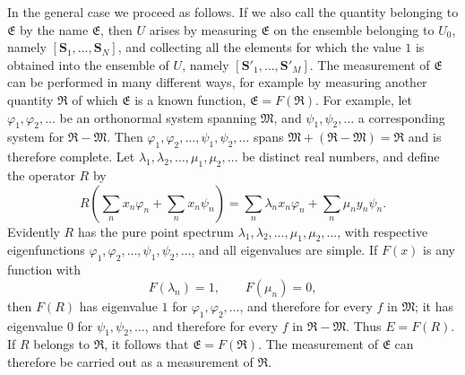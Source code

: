 \documentclass[fontsize=13pt,twoside,openany,headings=normal,parskip=false,bookmarkpackage=false,DIV=calc]{scrbook}
\begin{document}
In the general case we proceed as follows. If we also call the quantity belonging to $\mathfrak E$ by the name $\mathfrak E$, then $U$ arises by
\hypertarget{origpage-181}{}%
measuring $\mathfrak E$ on the ensemble belonging to $U_0$, namely $[\boldsymbol{S}_1,\ldots,\boldsymbol{S}_N]$, and collecting all the elements for which the value $1$ is obtained into the ensemble of $U$, namely $[\boldsymbol{S}'_1,\ldots,\boldsymbol{S}'_M]$. The measurement of $\mathfrak E$ can be performed in many different ways, for example by measuring another quantity $\mathfrak R$ of which $\mathfrak E$ is a known function, $\mathfrak E=F(\mathfrak R)$. For example, let $\varphi_1,\varphi_2,\ldots$ be an orthonormal system spanning $\mathfrak M$, and $\psi_1,\psi_2,\ldots$ a corresponding system for $\mathfrak R-\mathfrak M$. Then $\varphi_1,\varphi_2,\ldots,\psi_1,\psi_2,\ldots$ spans $\mathfrak M+(\mathfrak R-\mathfrak M)=\mathfrak R$ and is therefore complete. Let $\lambda_1,\lambda_2,\ldots,\mu_1,\mu_2,\ldots$ be distinct real numbers, and define the operator $R$ by
\[
R\left(\sum_nx_n\varphi_n+\sum_nx_n\psi_n\right)
=\sum_n\lambda_nx_n\varphi_n+\sum_n\mu_ny_n\psi_n.
\]
Evidently $R$ has the pure point spectrum $\lambda_1,\lambda_2,\ldots,\mu_1,\mu_2,\ldots$, with respective eigenfunctions $\varphi_1,\varphi_2,\ldots,\psi_1,\psi_2,\ldots$, and all eigenvalues are simple. If $F(x)$ is any function with
\[
F(\lambda_n)=1,\qquad F(\mu_n)=0,
\]
then $F(R)$ has eigenvalue $1$ for $\varphi_1,\varphi_2,\ldots$, and therefore for every $f$ in $\mathfrak M$; it has eigenvalue $0$ for $\psi_1,\psi_2,\ldots$, and therefore for every $f$ in $\mathfrak R-\mathfrak M$. Thus $E=F(R)$. If $R$ belongs to $\mathfrak R$, it follows that $\mathfrak E=F(\mathfrak R)$. The measurement of $\mathfrak E$ can therefore be carried out as a measurement of $\mathfrak R$.
\end{document}
